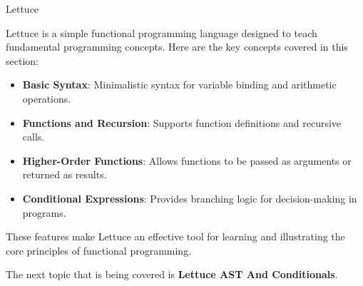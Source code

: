 \begin{notes}{Lettuce}
\begin{highlight}
    \end{highlight}
    
    \begin{highlight}
    
        Lettuce is a simple functional programming language designed to teach fundamental programming concepts. Here are the key concepts covered in this section:
        
        \begin{itemize}
            \item \textbf{Basic Syntax}: Minimalistic syntax for variable binding and arithmetic operations.
            \item \textbf{Functions and Recursion}: Supports function definitions and recursive calls.
            \item \textbf{Higher-Order Functions}: Allows functions to be passed as arguments or returned as results.
            \item \textbf{Conditional Expressions}: Provides branching logic for decision-making in programs.
        \end{itemize}
        
        These features make Lettuce an effective tool for learning and illustrating the core principles of functional programming.
    
    \end{highlight}
\end{notes}

The next topic that is being covered is \textbf{Lettuce AST And Conditionals}.

